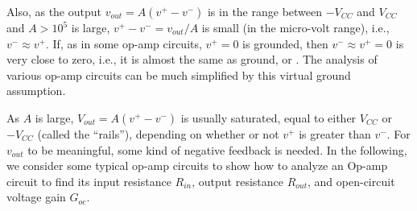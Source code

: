 \documentclass{article}
\begin{document}
Also, as the output $v_{out}=A(v^+-v^-)$ is in the range between $-V_{CC}$ 
and $V_{CC}$ and $A>10^5$ is large, $v^+-v^-=v_{out}/A$ is small (in the 
micro-volt range), i.e., $v^-\approx v^+$. If, as in some op-amp circuits, 
$v^+=0$ is grounded, then $v^-\approx v^+=0$ is very close to zero, i.e., 
it is almost the same as ground, or 
.
The analysis of various op-amp circuits can be much simplified by this virtual
ground assumption.

As $A$ is large, $V_{out}=A(v^+-v^-)$ is usually saturated, equal to either 
$V_{CC}$ or $-V_{CC}$ (called the ``rails''), depending on whether or not 
$v^+$ is greater than $v^-$. For $v_{out}$ to be meaningful, some kind of
negative feedback is needed. In the following, we consider some typical 
op-amp circuits to show how to analyze an Op-amp circuit to find its input 
resistance $R_{in}$, output resistance $R_{out}$, and open-circuit voltage 
gain $G_{oc}$.
\end{document}
